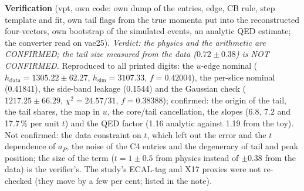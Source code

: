 \documentclass[11pt,a4paper]{article}
\newcommand{\aP}{\ensuremath{a_P}\xspace}
\begin{document}
\textbf{Verification} (vpt, own code: own dump of the entries, edge, CB rule, step template and fit, own tail flags from the true momenta put into the
reconstructed four-vectors, own bootstrap of the simulated events, an analytic QED estimate; the converter read on vae25). \emph{Verdict: the
physics and the arithmetic are CONFIRMED; the tail size measured from the data ($0.72\pm0.38$) is NOT CONFIRMED.} Reproduced to all printed
digits: the $u$-edge nominal ($h_{\mathrm{data}}=1305.22\pm62.27$, $h_{\mathrm{sim}}=3107.33$, $f=0.42004$), the per-slice nominal (0.41841), the
side-band leakage (0.1544) and the Gaussian check ($1217.25\pm66.29$, $\chi^2=24.57/31$, $f=0.38388$); confirmed: the origin of the tail, the
tail shares, the map in $u$, the core/tail cancellation, the slopes (6.8, 7.2 and 17.7\,\% per unit $t$) and the QED factor (1.16 analytic against
1.19 from the toy). Not confirmed: the data constraint on $t$, which left out the error and the $t$ dependence of \aP, the noise of the C4 entries
and the degeneracy of tail and peak position; the size of the term ($t=1\pm0.5$ from physics instead of $\pm0.38$ from the data) is
the verifier's. The study's ECAL-tag and X17 proxies were not re-checked (they move by a few per cent; listed in the note).
\end{document}
